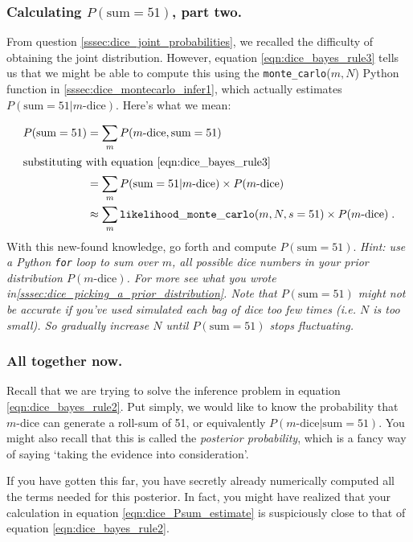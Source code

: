 \documentclass[11pt, oneside]{article}   	%
\begin{document}
\subsubsection{Calculating $P(\text{sum}=51)$, part two.}\label{sssec:dice_Psum_estimate}
From question \ref{sssec:dice_joint_probabilities}, we recalled the difficulty of obtaining the joint distribution. However, equation \eqref{eqn:dice_bayes_rule3} tells us that we might be able to compute this using the {\tt monte\_carlo}($m, N$) Python function in \ref{sssec:dice_montecarlo_infer1}, which actually estimates $P(\text{sum}=51|m\text{-dice})$. Here's what we mean:

\begin{align}
P(\text{sum}=51) &= \sum_m P(m \text{-dice}, \text{sum}=51) \nonumber \\
\intertext{substituting with equation \eqref{eqn:dice_bayes_rule3}}
 &= \sum_m P(\text{sum}=51| m\text{-dice})  \times P(m\text{-dice}) \nonumber \\
 &\approx \sum_m {\tt likelihood\_monte\_carlo}(m, N,s=51) \times P(m\text{-dice}) \;. \label{eqn:dice_Psum_estimate}
\end{align}
With this new-found knowledge, go forth and compute $P(\text{sum}=51)$. {\it Hint: use a Python {\tt for} loop to sum over $m$, all possible dice numbers in your prior distribution $P(m\text{-dice})$. For more see what you wrote in\ref{sssec:dice_picking_a_prior_distribution}. Note that $P(\text{sum}=51)$ might not be accurate if you've used simulated each bag of dice too few times (i.e. $N$ is too small). So gradually increase $N$ until $P(\text{sum}=51)$ stops fluctuating.}

\subsubsection{All together now.}\label{sssec:dice_posterior_estimate}
Recall that we are trying to solve the inference problem in equation \eqref{eqn:dice_bayes_rule2}. Put simply, we would like to know the probability that $m$-dice can generate a roll-sum of 51, or equivalently $P(m \text{-dice}| \text{sum}=51)$. You might also recall that this is called the {\it posterior probability}, which is a fancy way of saying `taking the evidence into consideration'.

If you have gotten this far, you have secretly already numerically computed all the terms needed for this posterior. In fact, you might have realized that your calculation in equation \eqref{eqn:dice_Psum_estimate} is suspiciously close to that of equation \eqref{eqn:dice_bayes_rule2}.
\end{document}
